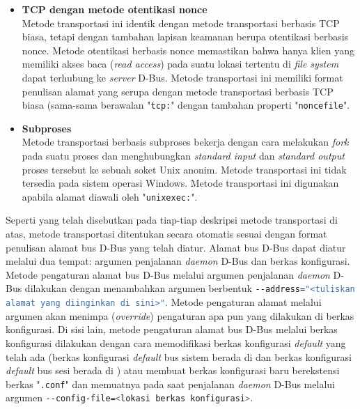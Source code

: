 \begin{itemize}
    \item \textbf{TCP dengan metode otentikasi nonce}\\
    Metode transportasi ini identik dengan metode transportasi berbasis TCP biasa, tetapi dengan tambahan lapisan keamanan berupa otentikasi berbasis nonce. Metode otentikasi berbasis nonce memastikan bahwa hanya klien yang memiliki akses baca (\textit{read access}) pada suatu lokasi tertentu di \textit{file system} dapat terhubung ke \textit{server} D-Bus. Metode transportasi ini memiliki format penulisan alamat yang serupa dengan metode transportasi berbasis TCP biasa (sama-sama berawalan "\verb|tcp:|" dengan tambahan properti "\verb|noncefile|".

    \item \textbf{Subproses}\\
    Metode transportasi berbasis subproses bekerja dengan cara melakukan \textit{fork} pada suatu proses dan menghubungkan \textit{standard input} dan \textit{standard output} proses tersebut ke sebuah soket Unix anonim. Metode transportasi ini tidak tersedia pada sistem operasi Windows. Metode transportasi ini digunakan apabila alamat diawali oleh "\verb|unixexec:|".
\end{itemize}

Seperti yang telah disebutkan pada tiap-tiap deskripsi metode transportasi di atas, metode transportasi ditentukan secara otomatis sesuai dengan format penulisan alamat bus D-Bus yang telah diatur. Alamat bus D-Bus dapat diatur melalui dua tempat: argumen penjalanan \textit{daemon} D-Bus dan berkas konfigurasi. Metode pengaturan alamat bus D-Bus melalui argumen penjalanan \textit{daemon} D-Bus dilakukan dengan menambahkan argumen berbentuk \lstinline[language=bash,columns=fixed]{--address="<tuliskan alamat yang diinginkan di sini>"}. Metode pengaturan alamat melalui argumen akan menimpa (\textit{override}) pengaturan apa pun yang dilakukan di berkas konfigurasi. Di sisi lain, metode pengaturan alamat bus D-Bus melalui berkas konfigurasi dilakukan dengan cara memodifikasi berkas konfigurasi \textit{default} yang telah ada (berkas konfigurasi \textit{default} bus sistem berada di  dan berkas konfigurasi \textit{default} bus sesi berada di ) atau membuat berkas konfigurasi baru berekstensi berkas "\verb|.conf|" dan memuatnya pada saat penjalanan \textit{daemon} D-Bus melalui argumen \lstinline[language=bash,columns=fixed]{--config-file=<lokasi berkas konfigurasi>}.

